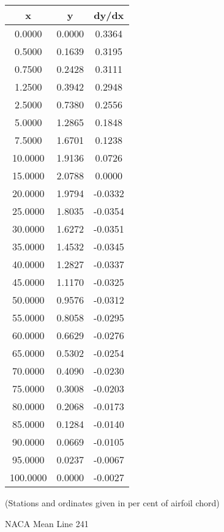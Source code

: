 \documentclass[11pt]{book}
\begin{document}
 \vspace{8mm}
 \begin{tabular}{|c|c|c|}  \hline
 x & y & dy/dx \\
 \hline
0.0000 & 0.0000 & 0.3364 \\
0.5000 & 0.1639 & 0.3195 \\
0.7500 & 0.2428 & 0.3111 \\
1.2500 & 0.3942 & 0.2948 \\
2.5000 & 0.7380 & 0.2556 \\
5.0000 & 1.2865 & 0.1848 \\
7.5000 & 1.6701 & 0.1238 \\
10.0000 & 1.9136 & 0.0726 \\
15.0000 & 2.0788 & 0.0000 \\
20.0000 & 1.9794 & -0.0332 \\
25.0000 & 1.8035 & -0.0354 \\
30.0000 & 1.6272 & -0.0351 \\
35.0000 & 1.4532 & -0.0345 \\
40.0000 & 1.2827 & -0.0337 \\
45.0000 & 1.1170 & -0.0325 \\
50.0000 & 0.9576 & -0.0312 \\
55.0000 & 0.8058 & -0.0295 \\
60.0000 & 0.6629 & -0.0276 \\
65.0000 & 0.5302 & -0.0254 \\
70.0000 & 0.4090 & -0.0230 \\
75.0000 & 0.3008 & -0.0203 \\
80.0000 & 0.2068 & -0.0173 \\
85.0000 & 0.1284 & -0.0140 \\
90.0000 & 0.0669 & -0.0105 \\
95.0000 & 0.0237 & -0.0067 \\
100.0000 & 0.0000 & -0.0027 \\
 \hline
 \end{tabular}
 \vspace{8mm}

(Stations and ordinates given in per cent of airfoil chord)

 \newpage
 \label{ml241}
 \begin{Large}
 NACA Mean Line 241
 \end{Large}
  
\end{document}
